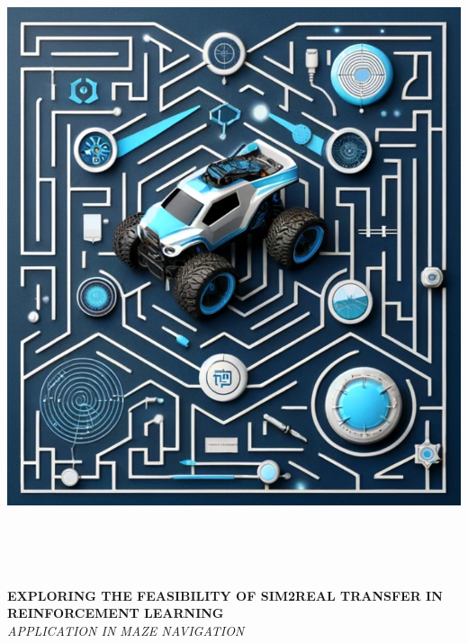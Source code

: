 \documentclass[12pt]{article}
\begin{document}
\begin{titlepage}
    \selectfont
    
    \begin{center}
        \includegraphics[width=18.5cm,height=18.5cm]{./thesis_helpers/cover_image.png}
    \end{center}
    \begin{adjustwidth}{1.5cm}{1.5cm}

    \vspace{0.5em}

    \MakeUppercase{\huge\textbf{Exploring the Feasibility of Sim2Real Transfer in Reinforcement Learning}} \\
    \MakeUppercase{\Large\textit{Application in Maze Navigation}}


\end{adjustwidth}
\end{titlepage}
\end{document}
